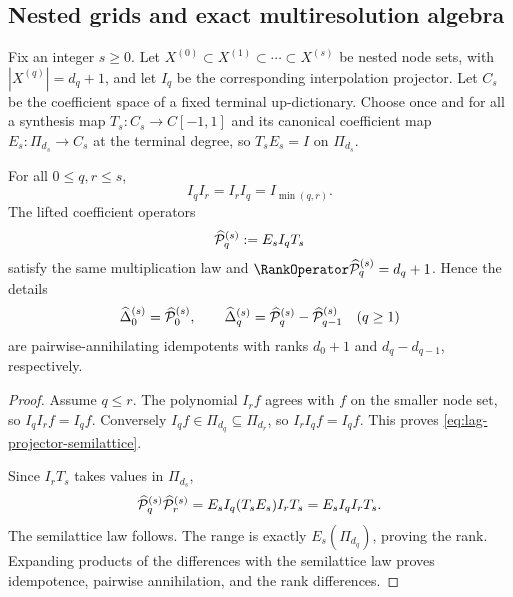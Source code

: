\subsection{Nested grids and exact multiresolution algebra}

Fix an integer $s\ge0$.  Let
$X^{(0)}\subset X^{(1)}\subset\cdots\subset X^{(s)}$ be nested node
sets, with $|X^{(q)}|=d_q+1$, and let $I_q$ be the corresponding
interpolation projector.  Let $C_s$ be the coefficient space of a fixed
terminal up-dictionary.  Choose once and for all a synthesis map
$T_s:C_s\to C[-1,1]$ and its canonical coefficient map
$E_s:\Pi_{d_s}\to C_s$ at the terminal degree, so
$T_sE_s=I$ on $\Pi_{d_s}$.

\begin{theorem}
\label{thm:lag-nested-flag}
For all $0\le q,r\le s$,
\begin{equation}
 \boxed{I_qI_r=I_rI_q=I_{\min(q,r)}.}
 \label{eq:lag-projector-semilattice}
\end{equation}
The lifted coefficient operators
\begin{equation}
 \widehat{\mathcal P}_{q}^{(s)}:=E_sI_qT_s
 \label{eq:lag-lifted-projector}
\end{equation}
satisfy the same multiplication law and
$\RankOperator\LiftedCoefficientProjector{q}{s}=d_q+1$.  Hence the details
\begin{equation}
 \widehat\Delta_{0}^{(s)}=\widehat{\mathcal P}_{0}^{(s)},
 \qquad
 \widehat\Delta_{q}^{(s)}=
 \widehat{\mathcal P}_{q}^{(s)}-\widehat{\mathcal P}_{q-1}^{(s)}
 \quad(q\ge1)
 \label{eq:lag-lifted-details}
\end{equation}
are pairwise-annihilating idempotents with ranks
$d_0+1$ and $d_q-d_{q-1}$, respectively.
\end{theorem}

\begin{proof}
Assume $q\le r$.  The polynomial $I_rf$ agrees with $f$ on the smaller node
set, so $I_qI_rf=I_qf$.  Conversely $I_qf\in\Pi_{d_q}\subseteq\Pi_{d_r}$,
so $I_rI_qf=I_qf$.  This proves \eqref{eq:lag-projector-semilattice}.

Since $I_rT_s$ takes values in $\Pi_{d_s}$,
\[
 \widehat{\mathcal P}_{q}^{(s)}\widehat{\mathcal P}_{r}^{(s)}
 =E_sI_q(T_sE_s)I_rT_s
 =E_sI_qI_rT_s.
\]
The semilattice law follows.  The range is exactly
$E_s(\Pi_{d_q})$, proving the rank.  Expanding products of the differences
with the semilattice law proves idempotence, pairwise annihilation, and the
rank differences.
\end{proof}


